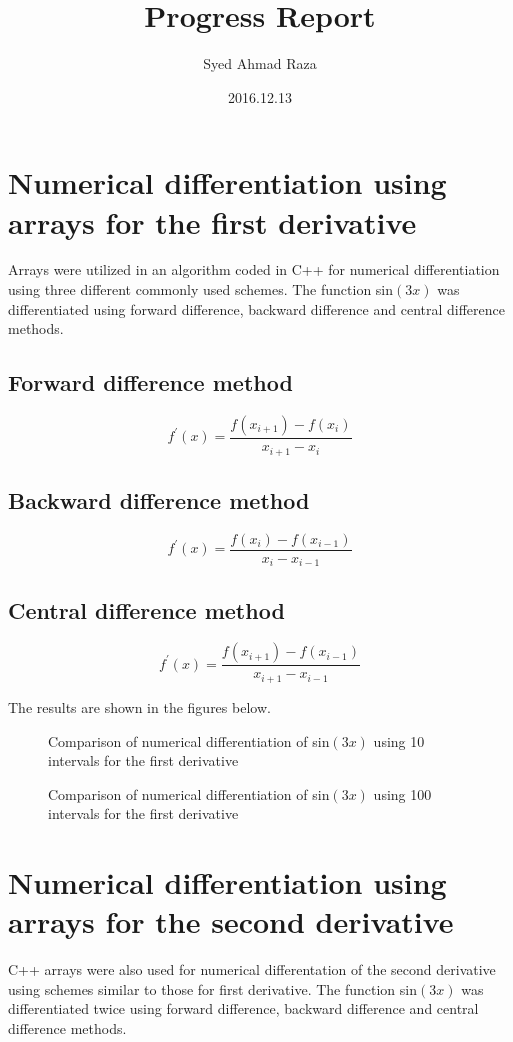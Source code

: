 \documentclass[12pt,a4paper,fleqn]{article}
\title{Progress Report}
\author{Syed Ahmad Raza}
\date{2016.12.13}
\begin{document}
\maketitle \section*{Numerical differentiation using arrays for the first
derivative}
Arrays were utilized in an algorithm coded in C++ for numerical differentiation
using three different commonly used schemes. The function sin$(3x)$ was
differentiated using forward difference, backward difference and central
difference methods.

\subsection*{Forward difference method}
\begin{equation}
f^\prime(x) = \frac{f(x_{i+1})-f(x_i)}{x_{i+1}-x_i}
\end{equation}

\subsection*{Backward difference method}
\begin{equation}
f^\prime(x) = \frac{f(x_i)-f(x_{i-1})}{x_i-x_{i-1}}
\end{equation}

\subsection*{Central difference method}
\begin{equation}
f^\prime(x) = \frac{f(x_{i+1})-f(x_{i-1})}{x_{i+1}-x_{i-1}}
\end{equation}

The results are shown in the figures below.

\begin{figure}[p!]
\centering

\caption{Comparison of numerical differentiation of sin$(3x)$ using 10 intervals
for the first derivative}
\end{figure}
\begin{figure}[p!]
\centering

\caption{Comparison of numerical differentiation of sin$(3x)$ using 100
intervals for the first derivative}
\end{figure}

\section*{Numerical differentiation using arrays for the second
derivative}
C++ arrays were also used for numerical differentation of the second
derivative using schemes similar to those for first derivative. The function
sin$(3x)$ was differentiated twice using forward difference, backward difference
and central difference methods.
\end{document}

